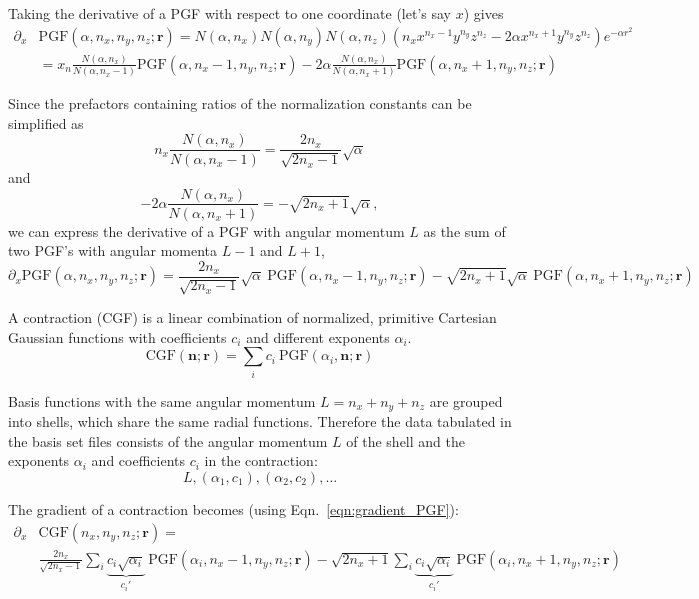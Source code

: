 \documentclass[journal=jacsat,manuscript=article]{achemso}
\renewcommand\vec[1]{\mathbf{#1}}
\begin{document}
Taking the derivative of a PGF with respect to one coordinate (let's say $x$) gives
\begin{align}
  \partial_x & \text{PGF}(\alpha,n_x,n_y,n_z; \vec{r}) =
  N(\alpha,n_x) N(\alpha,n_y) N(\alpha,n_z) \left(n_x x^{n_x-1} y^{n_y} z^{n_z} - 2 \alpha x^{n_x+1} y^{n_y} z^{n_z} \right) e^{-\alpha r^2} \\
  &= x_n \frac{N(\alpha,n_x)}{N(\alpha,n_x-1)} \text{PGF}(\alpha,n_x-1,n_y,n_z; \vec{r})
    -2\alpha \frac{N(\alpha,n_x)}{N(\alpha,n_x+1)} \text{PGF}(\alpha,n_x+1,n_y,n_z; \vec{r})
\end{align}

Since the prefactors containing ratios of the normalization constants can be simplified as
\begin{equation}
  n_x \frac{N(\alpha,n_x)}{N(\alpha,n_x-1)} = \frac{2 n_x}{\sqrt{2 n_x-1}} \sqrt{\alpha}
\end{equation}
and
\begin{equation}
 -2 \alpha \frac{N(\alpha,n_x)}{N(\alpha,n_x+1)} = -\sqrt{2 n_x + 1} \sqrt{\alpha},
\end{equation}
we can express the derivative of a PGF with angular momentum $L$ as the sum of two PGF's with angular momenta $L-1$ and $L+1$,
\begin{equation}
   \partial_x \text{PGF}(\alpha,n_x,n_y,n_z; \vec{r}) = \frac{2 n_x}{\sqrt{2 n_x-1}} \sqrt{\alpha} ~ \text{PGF}(\alpha,n_x-1,n_y,n_z; \vec{r}) - \sqrt{2 n_x + 1} \sqrt{\alpha} ~ \text{PGF}(\alpha,n_x+1,n_y,n_z; \vec{r}) \label{eqn:gradient_PGF}
\end{equation}

A contraction (CGF) is a linear combination of normalized, primitive Cartesian Gaussian functions\cite{Hehre1969} with coefficients $c_i$ and different exponents $\alpha_i$.
\begin{equation}
  \text{CGF}(\vec{n};\vec{r}) = \sum_i c_i ~ \text{PGF}(\alpha_i,\vec{n};\vec{r})
  \label{eqn:CGF}
\end{equation}

Basis functions with the same angular momentum $L=n_x+n_y+n_z$ are grouped into shells, which share the same radial functions. Therefore the data tabulated in the basis set files consists of the angular momentum $L$ of the shell and the exponents $\alpha_i$ and coefficients $c_i$ in the contraction:
\begin{equation}
L, (\alpha_1, c_1), (\alpha_2, c_2), \ldots
\end{equation}

The gradient of a contraction becomes (using Eqn.~\ref{eqn:gradient_PGF}):
\begin{equation}
\begin{split}
  \partial_x & \text{CGF}(n_x,n_y,n_z; \vec{r}) = \\
    & \frac{2 n_x}{\sqrt{2 n_x - 1}} \sum_i \underbrace{c_i \sqrt{\alpha_i}}_{c_i'} ~ \text{PGF}(\alpha_i, n_x-1,n_y,n_z; \vec{r}) - \sqrt{2 n_x + 1} \sum_i \underbrace{c_i \sqrt{\alpha_i}}_{c_i'} ~ \text{PGF}(\alpha_i, n_x+1,n_y,n_z; \vec{r})
\end{split}
\end{equation}
\end{document}
